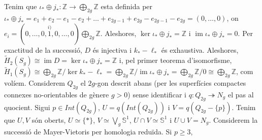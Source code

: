 \documentclass[compress,10pt]{article}
\theoremstyle{definition}
\DeclareMathOperator{\im}{im}
\begin{document}
Tenim que $\iota_{*}\oplus j_{*}:\mathbb{Z}\rightarrow\bigoplus_{2g}\mathbb{Z}$ esta definida per $\iota_{*}\oplus j_{*}=e_{1}+e_{2}-e_{1}-e_{2}+\ldots+e_{2g-1}+e_{2g}-e_{2g-1}-e_{2g}=(0,\ldots,0)$, on $e_{i}=(0,\ldots,0,\overset{i)}{1},0,\ldots,0)\bigoplus_{2g}\mathbb{Z}$. Aleshores, $\ker{\iota_{*}\oplus j_{*}}=\mathbb{Z}$ i $\im{\iota_{*}\oplus j_{*}}=0$. Per exactitud de la successió, $D$ és injectiva i $k_{*}-\ell_{*}$ és exhaustiva. Aleshores, $\widetilde{H}_{2}(S_{g})\cong\im{D}=\ker{\iota_{*}\oplus j_{*}}=\mathbb{Z}$ i, pel primer teorema d'isomorfisme, $\widetilde{H}_{1}(S_{g})\cong\bigoplus_{2g}\mathbb{Z}/\ker{k_{*}-\ell_{*}}=\bigoplus_{2g}\mathbb{Z}/\im{\iota_{*}\oplus j_{*}}=\bigoplus_{2g}\mathbb{Z}/0\cong\bigoplus_{2g}\mathbb{Z}$, com volíem.\newline
Considerem $Q_{2g}$ el $2g$-gon descrit abans (per les superfícies compactes connexes no-orientables de gènere $g>0$) sense identificar i $q:Q_{2g}\twoheadrightarrow N_{g}$ el pas al quocient. Sigui $p\in Int(Q_{2g})$, $U=q(Int(Q_{2g}))$ i $V=q(Q_{2g}-\{p\})$. Tenim que $U,V$ són oberts, $U\simeq\{*\}$, $V\simeq\bigvee_{g}\mathbb{S}^{1}$, $U\cap V\simeq\mathbb{S}^{1}$ i $U\cup V=N_{g}$. Considerem la successió de Mayer-Vietoris per homologia reduïda. Si $p\geq3$,
\begin{center}
\end{center}
\end{document}
